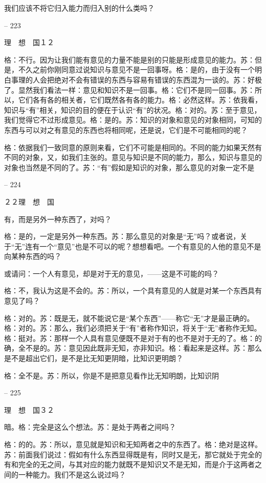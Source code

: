 \documentclass[11pt,oneside]{book}
\begin{document}
\begin{common-format}
    我们应该不将它归入能力而归入别的什么类吗？

    

-- 223

    理　想　国１２

    格：不行。因为让我们能有意见的力量不能是别的只能是形成意见的能力。苏：但是，不久之前你刚同意过说知识与意见不是一回事呀。格：是的，由于没有一个明白事理的人会把绝对不会有错误的东西与容易有错误的东西混为一谈的。苏：好极了。显然我们看法一样：意见和知识不是一回事。格：它们不是同一回事。苏：所以，它们各有各的相关者，它们既然各有各的能力。格：必然这样。苏：依我看，知识与“有”相关，知识的目的便在于认识“有”的状况。格：对的。苏：至于意见，我们觉得它不过形成意见。格：是的。苏：知识的对象和意见的对象相同，可知的东西与可以对之有意见的东西也将相同呢，还是说，它们是不可能相同的呢？

    格：依据我们一致同意的原则来看，它们不可能是相同的。不同的能力如果天然有不同的对象，又，如我们主张的。意见与知识是不同的能力，那么，知识与意见的对象也当然是不同的了。苏：“有”假如是知识的对象，那么意见的对象一定不是

    

-- 224

    ２２理　想　国

    有，而是另外一种东西了，对吗？

    格：是的，一定是另外一种东西。苏：那么意见的对象是“无”吗？或者说，关于“无”连有一个“意见”也是不可以的呢？想想看吧。一个有意见的人他的意见不是向某种东西的吗？

    或请问：一个人有意见，却是对于无的意见，——这是不可能的吗？

    格：不，我认为这是不会的。苏：所以，一个具有意见的人就是对某一个东西具有意见了吗？

    格：对的。苏：既是无，就不能说它是“某个东西”——称它“无”才是最正确的。格：对的。苏：那么，我们必须把关于“有”者称作知识，将关于“无”者称作无知。格：挺对。苏：那样一个人具有意见便既不是对于有的也不是对于无的了。格：的确，全不是的。苏：意见因此既非无知，亦非知识。格：看起来是这样。苏：那么是不是超出它们，是不是比无知更阴暗，比知识更明朗？

    格：全不是。苏：所以，你是不是把意见看作比无知明朗，比知识阴

    

-- 225

    理　想　国３２

    暗。格：完全是这么个想法。苏：是处于两者之间吗？

    格：的的。苏：所以，意见就是知识和无知两者之中的东西了。格：绝对是这样。苏：前面我们说过：假如有什么东西显得既是有，同时又是无，那它就处于完全的有和完全的无之间，与其对应的能力就既不是知识又不是无知，而是介于这两者之间的一种能力。我们不是这么说过吗？


\end{common-format}
\end{document}
